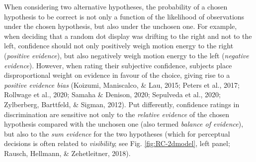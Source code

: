 \documentclass[12pt,twoside]{reedthesis}
\begin{document}
When considering two alternative hypotheses, the probability of a chosen hypothesis to be correct is not only a function of the likelihood of observations under the chosen hypothesis, but also under the unchosen one. For example, when deciding that a random dot display was drifting to the right and not to the left, confidence should not only positively weigh motion energy to the right (\emph{positive evidence}), but also negatively weigh motion energy to the left (\emph{negative evidence}). However, when rating their subjective confidence, subjects place disproportional weight on evidence in favour of the choice, giving rise to a \emph{positive evidence bias} (Koizumi, Maniscalco, \& Lau, 2015; Peters et al., 2017; Rollwage et al., 2020; Samaha \& Denison, 2020; Sepulveda et al., 2020; Zylberberg, Barttfeld, \& Sigman, 2012). Put differently, confidence ratings in discrimination are sensitive not only to the \emph{relative evidence} of the chosen hypothesis compared with the unchosen one (also termed \emph{balance of evidence}), but also to the \emph{sum evidence} for the two hypotheses (which for perceptual decisions is often related to \emph{visibility}; see Fig. \ref{fig:RC-2dmodel}, left panel; Rausch, Hellmann, \& Zehetleitner, 2018).
\end{document}
